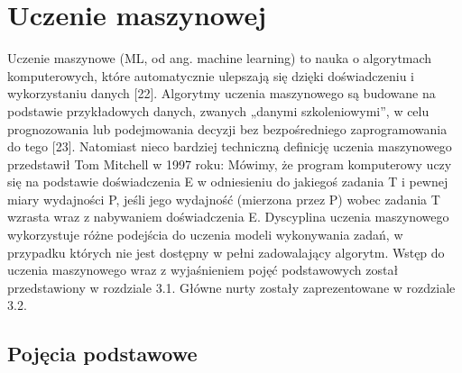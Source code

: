 %		
%
%
%
%

\chapter{Uczenie maszynowej}
\label{cha:cha3}

Uczenie maszynowe (ML, od ang. machine learning) to nauka o algorytmach komputerowych, które automatycznie ulepszają się dzięki doświadczeniu i wykorzystaniu danych [22]. Algorytmy uczenia maszynowego są budowane na podstawie przykładowych danych, zwanych „danymi szkoleniowymi”, w celu prognozowania lub podejmowania decyzji bez bezpośredniego zaprogramowania do tego [23]. Natomiast nieco bardziej techniczną definicję uczenia maszynowego przedstawił Tom Mitchell w 1997 roku: Mówimy, że program komputerowy uczy się na podstawie doświadczenia E w odniesieniu do jakiegoś zadania T i pewnej miary wydajności P, jeśli jego wydajność (mierzona przez P) wobec zadania T wzrasta wraz z nabywaniem doświadczenia E.
    Dyscyplina uczenia maszynowego wykorzystuje różne podejścia do uczenia modeli wykonywania zadań, w przypadku których nie jest dostępny w pełni zadowalający algorytm. Wstęp do uczenia maszynowego wraz z wyjaśnieniem pojęć podstawowych został przedstawiony w rozdziale 3.1. Główne nurty zostały zaprezentowane w rozdziale 3.2.

\section{Pojęcia podstawowe}
\label{cha:cha3.1}

